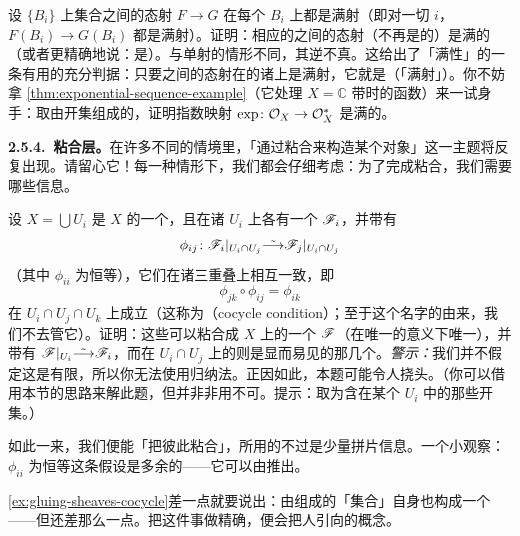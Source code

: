 \begin{exercise}[不重要练习]\label{ex:surjectivity-on-base}
设\trBase{} $\{B_i\}$ 上集合\trSheaf{}之间的态射 $F\to G$ 在每个 $B_i$ 上都是满射（即对一切 $i$，$F(B_i)\to G(B_i)$ 都是满射）。证明：相应的\trSheaf{}之间的态射（不再是\trSheafOnBase{}的）是满的（或者更精确地说：是\trEpimorphism）。与单射的情形不同，其逆不真。这给出了「满性」的一条有用的充分判据：只要\trSheaf{}之间的态射在\trBase{}的诸\trSection{}上是满射，它就是\trEpimorphism（「满射」）。你不妨拿 \cref{thm:exponential-sequence-example}（它处理 $X=\mathbb{C}$ 带\trClassicalTopology{}时的\trHolomorphic{}函数）来一试身手：取由\trContractible{}开集组成的\trBase，证明指数映射 $\exp\colon\mathcal{O}_X\to\mathcal{O}_X^*$ 是满的。
\end{exercise}

\textbf{2.5.4.\ 粘合层。}\quad 在许多不同的情境里，「通过粘合来构造某个对象」这一主题将反复出现。请留心它！每一种情形下，我们都会仔细考虑：为了完成粘合，我们需要哪些信息。

\begin{exercise}[重要练习]\label{ex:gluing-sheaves-cocycle}
设 $X=\bigcup U_i$ 是 $X$ 的一个\trOpenCover，且在诸 $U_i$ 上各有一个\trSheaf{} $\mathscr{F}_i$，并带有\trIsomorphism
\[
\phi_{ij}\colon\mathscr{F}_i|_{U_i\cap U_j}\tilde{\longrightarrow}\mathscr{F}_j|_{U_i\cap U_j}
\]
（其中 $\phi_{ii}$ 为恒等），它们在诸三重叠上相互一致，即
\begin{equation*}\tag{2.5.4.1}\label{eq:cocycle-condition}
\phi_{jk}\circ\phi_{ij}=\phi_{ik}
\end{equation*}
在 $U_i\cap U_j\cap U_k$ 上成立（这称为\textbf{\trCocycleCondition}（cocycle condition）；至于这个名字的由来，我们不去管它）。证明：这些\trSheaf{}可以粘合成 $X$ 上的一个\trSheaf{} $\mathscr{F}$（在唯一的\trIsomorphism{}意义下唯一），并带有\trIsomorphism{} $\mathscr{F}|_{U_i}\tilde{\longrightarrow}\mathscr{F}_i$，而在 $U_i\cap U_j$ 上的\trIsomorphism{}则是显而易见的那几个。\emph{警示：}我们并不假定这是有限\trCover，所以你无法使用归纳法。正因如此，本题可能令人挠头。（你可以借用本节的思路来解此题，但并非非用不可。提示：取\trBase{}为含在某个 $U_i$ 中的那些开集。）
\end{exercise}

如此一来，我们便能「把\trSheaf{}彼此粘合」，所用的不过是少量拼片信息。一个小观察：$\phi_{ii}$ 为恒等这条假设是多余的——它可以由\trCocycleCondition{}推出。

\begin{remark}[给行家的注记]\label{thm:stack-remark-for-experts}
\cref{ex:gluing-sheaves-cocycle}差一点就要说出：由\trSheaf{}组成的「集合」自身也构成一个\trSheaf——但还差那么一点。把这件事做精确，便会把人引向\trStack{}的概念。
\end{remark}
